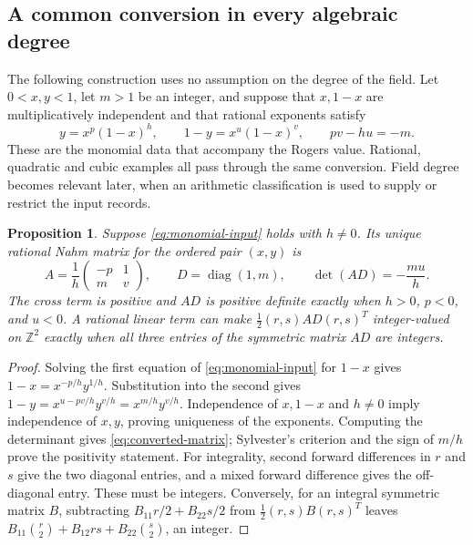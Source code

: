 \documentclass[11pt,reqno]{amsart}
\newtheorem{proposition}[theorem]{Proposition}
\theoremstyle{remark}
\numberwithin{equation}{section}
\newcommand{\ZZ}{\mathbb Z}
\begin{document}
\subsection{A common conversion in every algebraic degree}
\label{sec:conversion}
The following construction uses no assumption on the degree of the field.
Let $0<x,y<1$, let $m>1$ be an integer, and suppose that $x,1-x$
are multiplicatively independent and that rational exponents satisfy
\begin{equation}\label{eq:monomial-input}
 y=x^p(1-x)^h,\qquad 1-y=x^u(1-x)^v,
 \qquad pv-hu=-m.
\end{equation}
These are the monomial data that accompany the Rogers value. Rational,
quadratic and cubic examples all pass through the same conversion.
Field degree becomes relevant later, when an arithmetic classification
is used to supply or restrict the input records.

\begin{proposition}\label{prop:monomial-matrix}
Suppose \eqref{eq:monomial-input} holds with $h\ne0$. Its unique rational
Nahm matrix for the ordered pair $(x,y)$ is
\begin{equation}\label{eq:converted-matrix}
 A=\frac1h\begin{pmatrix}-p&1\\m&v\end{pmatrix},\qquad
 D=\operatorname{diag}(1,m),\qquad
 \det(AD)=-\frac{mu}{h}.
\end{equation}
The cross term is positive and $AD$ is positive definite exactly when
$h>0$, $p<0$, and $u<0$. A rational linear term can make
$\tfrac12(r,s)AD(r,s)^T$ integer-valued on $\ZZ^2$ exactly when
all three entries of the symmetric matrix $AD$ are integers.
\end{proposition}
\begin{proof}
Solving the first equation of \eqref{eq:monomial-input} for $1-x$ gives
$1-x=x^{-p/h}y^{1/h}$. Substitution into the second gives
$1-y=x^{u-pv/h}y^{v/h}=x^{m/h}y^{v/h}$. Independence of $x,1-x$
and $h\ne0$ imply independence of $x,y$, proving uniqueness of the
exponents. Computing the determinant gives \eqref{eq:converted-matrix};
Sylvester's criterion and the sign of $m/h$ prove the positivity statement.
For integrality, second forward differences in $r$ and $s$ give the two
diagonal entries, and a mixed forward difference gives the off-diagonal
entry. These must be integers. Conversely, for an integral symmetric
matrix $B$, subtracting $B_{11}r/2+B_{22}s/2$ from
$\tfrac12(r,s)B(r,s)^T$ leaves
$B_{11}\binom r2+B_{12}rs+B_{22}\binom s2$, an integer.
\end{proof}
\end{document}
